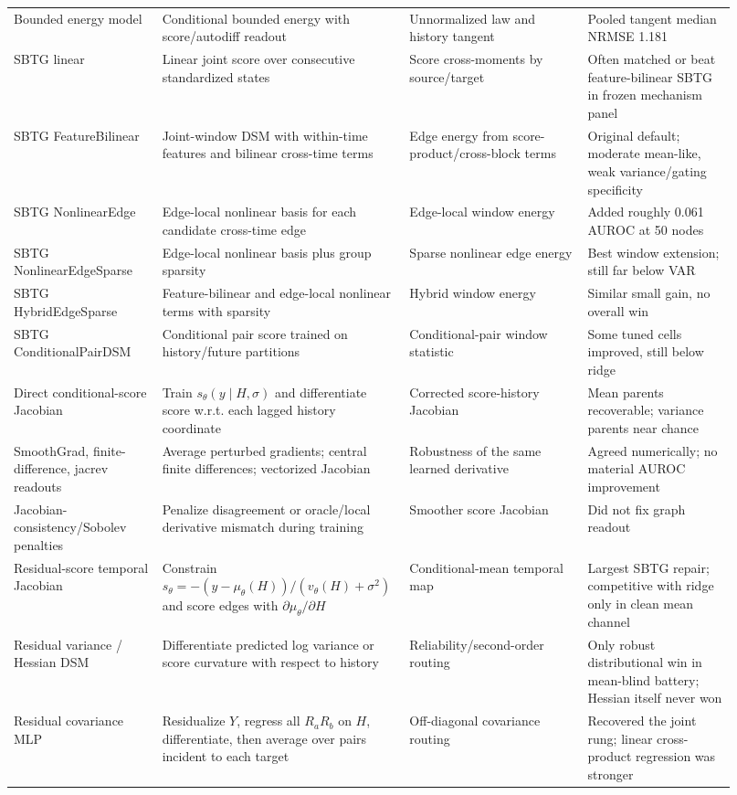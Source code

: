 \documentclass[10pt]{article}
\begin{document}
\begin{longtable}{L{0.20\linewidth}L{0.28\linewidth}L{0.24\linewidth}L{0.20\linewidth}}
Bounded energy model & Conditional bounded energy with score/autodiff readout & Unnormalized law and history tangent & Pooled tangent median NRMSE 1.181 \\
SBTG linear & Linear joint score over consecutive standardized states & Score cross-moments by source/target & Often matched or beat feature-bilinear SBTG in frozen mechanism panel \\
SBTG FeatureBilinear & Joint-window DSM with within-time features and bilinear cross-time terms & Edge energy from score-product/cross-block terms & Original default; moderate mean-like, weak variance/gating specificity \\
SBTG NonlinearEdge & Edge-local nonlinear basis for each candidate cross-time edge & Edge-local window energy & Added roughly 0.061 AUROC at 50 nodes \\
SBTG NonlinearEdgeSparse & Edge-local nonlinear basis plus group sparsity & Sparse nonlinear edge energy & Best window extension; still far below VAR \\
SBTG HybridEdgeSparse & Feature-bilinear and edge-local nonlinear terms with sparsity & Hybrid window energy & Similar small gain, no overall win \\
SBTG ConditionalPairDSM & Conditional pair score trained on history/future partitions & Conditional-pair window statistic & Some tuned cells improved, still below ridge \\
Direct conditional-score Jacobian & Train $s_\theta(y\mid H,\sigma)$ and differentiate score w.r.t. each lagged history coordinate & Corrected score-history Jacobian & Mean parents recoverable; variance parents near chance \\
SmoothGrad, finite-difference, jacrev readouts & Average perturbed gradients; central finite differences; vectorized Jacobian & Robustness of the same learned derivative & Agreed numerically; no material AUROC improvement \\
Jacobian-consistency/Sobolev penalties & Penalize disagreement or oracle/local derivative mismatch during training & Smoother score Jacobian & Did not fix graph readout \\
Residual-score temporal Jacobian & Constrain $s_\theta=-(y-\mu_\theta(H))/(v_\theta(H)+\sigma^2)$ and score edges with $\partial\mu_\theta/\partial H$ & Conditional-mean temporal map & Largest SBTG repair; competitive with ridge only in clean mean channel \\
Residual variance / Hessian DSM & Differentiate predicted log variance or score curvature with respect to history & Reliability/second-order routing & Only robust distributional win in mean-blind battery; Hessian itself never won \\
Residual covariance MLP & Residualize $Y$, regress all $R_aR_b$ on $H$, differentiate, then average over pairs incident to each target & Off-diagonal covariance routing & Recovered the joint rung; linear cross-product regression was stronger \\
\bottomrule
\end{longtable}
\end{document}
